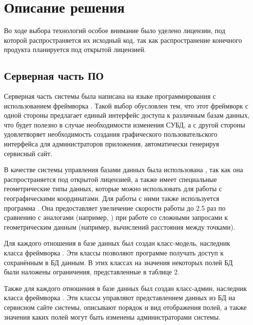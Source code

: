 
\section{Описание решения}

\tab
Во ходе выбора технологий особое внимание было уделено лицензии, под которой распространяется их исходный код, так как распространение конечного продукта планируется под открытой лицензией.

\subsection{Серверная часть ПО}
\label{subsec:serverside-app}

\tab
Серверная часть системы была написана на языке программирования  с использованием фреймворка .
Такой выбор обусловлен тем, что этот фреймворк с одной стороны предлагает единый интерфейс доступа к различным базам данных, что будет полезно в случае необходимости изменения СУБД, а с другой стороны удовлетворяет необходимость создания графического пользовательского интерфейса для администраторов приложения, автоматически генерируя сервисный сайт.

\tab
В качестве системы управления базами данных была использована , так как она распространяется под открытой лицензией, а также имеет специальные геометрические типы данных, которые можно использовать для работы с географическими координатами.
Для работы с ними также используется программа .
Она предоставляет увеличение скорости работы до 2.5 раз по сравнению с аналогами (например, ) при работе со сложными запросами к геометрическим данным (например, вычислений расстояния между точками)\cite{postgis-vs-mongo}.

\tab
Для каждого отношения в базе данных был создан класс-модель, наследник класса  фреймворка .
Эти классы позволяют программе получать доступ к сохранённым в БД данным.
В этих классах на значения некоторых полей БД были наложены ограничения, представленные в таблице 2.
\tabletwo

\tab
Также для каждого отношения в базе данных был создан класс-админ, наследник класса  фреймворка .
Эти классы управляют представлением данных из БД на сервисном сайте системы, описывают порядок и вид отображения полей, а также значения каких полей могут быть изменены администраторами системы.

